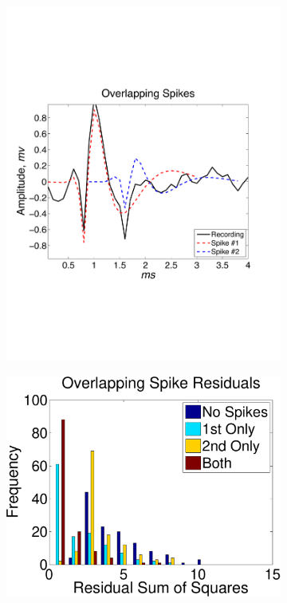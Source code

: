 
\begin{center}
\begin{figure}[h!]
\begin{subfigure}[b]{.49\textwidth}
\includegraphics[width=\textwidth]{../figs/alloverlappingspikes/olspike3}
\caption{}
\label{fig:overlapping}
\end{subfigure}
\begin{subfigure}[b]{.49\textwidth}
\includegraphics[width=\textwidth]{../figs/overlappingstat.pdf}

\end{subfigure}
\end{figure}
\end{center}
